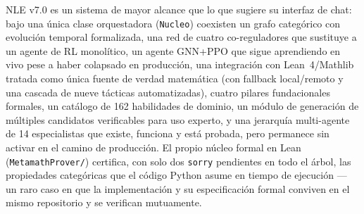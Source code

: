 \documentclass[11pt,a4paper]{report}
\newcommand{\code}[1]{\texttt{#1}}
\begin{document}
NLE v7.0 es un sistema de mayor alcance que lo que sugiere su interfaz de chat: bajo una \'unica clase orquestadora (\code{Nucleo}) coexisten un grafo categ\'orico con evoluci\'on temporal formalizada, una red de cuatro co-reguladores que sustituye a un agente de RL monol\'itico, un agente GNN+PPO que sigue aprendiendo en vivo pese a haber colapsado en producci\'on, una integraci\'on con Lean~4/Mathlib tratada como \'unica fuente de verdad matem\'atica (con fallback local/remoto y una cascada de nueve t\'acticas automatizadas), cuatro pilares fundacionales formales, un cat\'alogo de 162 habilidades de dominio, un m\'odulo de generaci\'on de m\'ultiples candidatos verificables para uso experto, y una jerarqu\'ia multi-agente de 14 especialistas que existe, funciona y est\'a probada, pero permanece sin activar en el camino de producci\'on. El propio n\'ucleo formal en Lean (\code{MetamathProver/}) certifica, con solo dos \code{sorry} pendientes en todo el \'arbol, las propiedades categ\'oricas que el c\'odigo Python asume en tiempo de ejecuci\'on --- un raro caso en que la implementaci\'on y su especificaci\'on formal conviven en el mismo repositorio y se verifican mutuamente.
\end{document}
